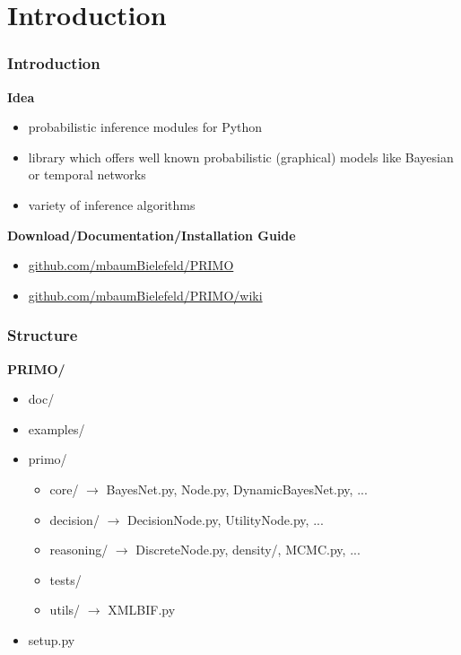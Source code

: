 \section{Introduction}

\begin{frame}
\frametitle{Introduction}
\Large\textbf{Idea}
\begin{itemize}
\item probabilistic inference modules for Python
\item library which offers well known probabilistic (graphical) models like Bayesian or temporal networks
\item variety of inference algorithms
\end{itemize}

\Large\textbf{Download/Documentation/Installation Guide}
\begin{itemize}
\item \url{github.com/mbaumBielefeld/PRIMO}
\item \url{github.com/mbaumBielefeld/PRIMO/wiki}
\end{itemize}

\end{frame}

\begin{frame}
\frametitle{Structure}
\Large\textbf{PRIMO/}
\begin{itemize}
\item doc/
\item examples/
\item primo/
\begin{itemize}
\item core/ $\rightarrow$ BayesNet.py, Node.py, DynamicBayesNet.py, ...
\item decision/ $\rightarrow$ DecisionNode.py, UtilityNode.py, ...
\item reasoning/ $\rightarrow$ DiscreteNode.py, density/, MCMC.py, ...
\item tests/
\item utils/ $\rightarrow$ XMLBIF.py
\end{itemize}
\item setup.py 
\end{itemize}
\end{frame}